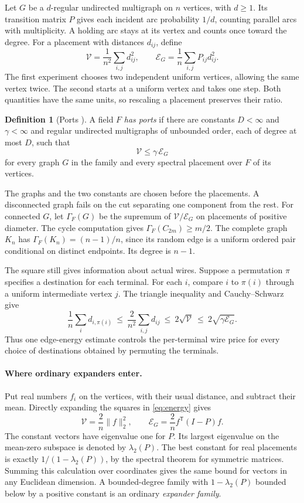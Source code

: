 \documentclass[11pt]{article}
\theoremstyle{definition}
\newtheorem{definition}[theorem]{Definition}
\newcommand{\Var}{\mathcal V}
\newcommand{\En}{\mathcal E}
\begin{document}
Let \(G\) be a \(d\)-regular undirected multigraph on \(n\) vertices, with
\(d\ge1\). Its transition matrix \(P\) gives each incident arc probability
\(1/d\), counting parallel arcs with multiplicity. A holding arc stays at
its vertex and counts once toward the degree. For a placement with
distances \(d_{ij}\), define
\begin{equation}
 \Var=\frac1{n^2}\sum_{i,j}d_{ij}^2,\qquad
 \En_G=\frac1n\sum_{i,j}P_{ij}d_{ij}^2.
 \label{eq:energy}
\end{equation}
The first experiment chooses two independent uniform vertices, allowing
the same vertex twice. The second starts at a uniform vertex and takes
one step. Both quantities have the same units, so rescaling a placement
preserves their ratio.

\begin{definition}[Ports {\cite{euclid}}]\label{def:ports}
A field \(F\) \emph{has ports} if there are constants \(D<\infty\) and
\(\gamma<\infty\) and regular undirected multigraphs of unbounded order,
each of degree at most \(D\), such that
\[
                       \Var\le\gamma\,\En_G
\]
for every graph \(G\) in the family and every spectral placement over \(F\)
of its vertices.
\end{definition}

The graphs and the two constants are chosen before the placements. A
disconnected graph fails on the cut separating one component from the
rest. For connected \(G\), let \(\Gamma_F(G)\) be the supremum of
\(\Var/\En_G\) on placements of positive diameter. The cycle computation
gives \(\Gamma_F(C_{2m})\ge m/2\). The complete graph \(K_n\) has
\(\Gamma_F(K_n)=(n-1)/n\), since its random edge is a uniform ordered
pair conditional on distinct endpoints. Its degree is \(n-1\).

The square still gives information about actual wires. Suppose a
permutation \(\pi\) specifies a destination for each terminal. For each
\(i\), compare \(i\) to \(\pi(i)\) through a uniform intermediate vertex
\(j\). The triangle inequality and Cauchy--Schwarz give
\[
 \frac1n\sum_i d_{i,\pi(i)}
   \ \le\ \frac{2}{n^2}\sum_{i,j}d_{ij}
   \ \le\ 2\sqrt{\Var}\ \le\ 2\sqrt{\gamma\En_G}.
\]
Thus one edge-energy estimate controls the per-terminal wire price for
every choice of destinations obtained by permuting the terminals.

\paragraph{Where ordinary expanders enter.}
Put real numbers \(f_i\) on the vertices, with their usual distance, and
subtract their mean. Directly expanding the squares in
\eqref{eq:energy} gives
\[
  \Var=\frac2n\|f\|_2^2,\qquad
  \En_G=\frac2n f^{\mathsf T}(I-P)f.
\]
The constant vectors have eigenvalue one for \(P\). Its largest eigenvalue
on the mean-zero subspace is denoted by \(\lambda_2(P)\). The best
constant for real placements is exactly \(1/(1-\lambda_2(P))\), by the
spectral theorem for symmetric matrices. Summing this calculation over
coordinates gives the same bound for vectors in any Euclidean dimension.
A bounded-degree family with \(1-\lambda_2(P)\) bounded below by a
positive constant is an ordinary \emph{expander family}.
\end{document}
